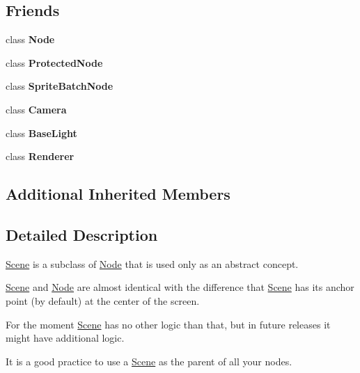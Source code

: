 \subsection*{Friends}
\begin{DoxyCompactItemize}
\item 
\mbox{\label{classScene_aed91756449328e2c454e53e9c5e53936}} 
class {\bfseries Node}
\item 
\mbox{\label{classScene_a7532f114e7c0a628f41d9aeac4207282}} 
class {\bfseries Protected\+Node}
\item 
\mbox{\label{classScene_a3132f3cfc4f874c13f9b2a9c4dfca000}} 
class {\bfseries Sprite\+Batch\+Node}
\item 
\mbox{\label{classScene_adc0591c2c6aa3aa864336ece4978ab62}} 
class {\bfseries Camera}
\item 
\mbox{\label{classScene_a07f30d31dcbd514a13d446c446632e7d}} 
class {\bfseries Base\+Light}
\item 
\mbox{\label{classScene_a7482e5338f9824f1190a0846d209c666}} 
class {\bfseries Renderer}
\end{DoxyCompactItemize}
\subsection*{Additional Inherited Members}


\subsection{Detailed Description}
\hyperlink{classScene}{Scene} is a subclass of \hyperlink{classNode}{Node} that is used only as an abstract concept. 

\hyperlink{classScene}{Scene} and \hyperlink{classNode}{Node} are almost identical with the difference that \hyperlink{classScene}{Scene} has its anchor point (by default) at the center of the screen.

For the moment \hyperlink{classScene}{Scene} has no other logic than that, but in future releases it might have additional logic.

It is a good practice to use a \hyperlink{classScene}{Scene} as the parent of all your nodes.

